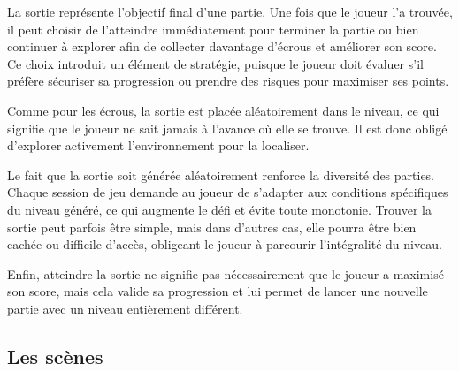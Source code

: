 \documentclass[10pt]{report}
\begin{document}
La sortie représente l'objectif final d'une partie.
Une fois que le joueur l'a trouvée, il peut choisir de l’atteindre immédiatement pour terminer la partie ou bien
continuer à explorer afin de collecter davantage d’écrous et améliorer son score.
Ce choix introduit un élément de stratégie, puisque le joueur doit évaluer s’il préfère sécuriser sa progression
ou prendre des risques pour maximiser ses points.

Comme pour les écrous, la sortie est placée aléatoirement dans le niveau, ce qui signifie que le joueur ne sait
jamais à l’avance où elle se trouve.
Il est donc obligé d’explorer activement l’environnement pour la localiser.

Le fait que la sortie soit générée aléatoirement renforce la diversité des parties.
Chaque session de jeu demande au joueur de s’adapter aux conditions spécifiques du niveau généré, ce qui augmente
le défi et évite toute monotonie.
Trouver la sortie peut parfois être simple, mais dans d’autres cas, elle pourra être bien cachée ou difficile d’accès,
obligeant le joueur à parcourir l’intégralité du niveau.

Enfin, atteindre la sortie ne signifie pas nécessairement que le joueur a maximisé son score, mais cela valide
sa progression et lui permet de lancer une nouvelle partie avec un niveau entièrement différent.

\subsection{Les scènes}
\end{document}
